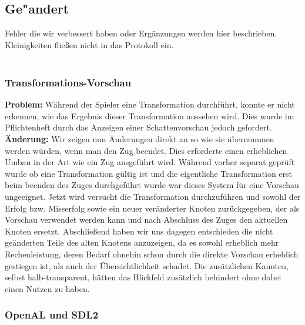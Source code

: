 %



\subsection{Ge{"a}ndert}
\label{Abschnitt:Aenderungen:Protokoll:Behobene_Probleme}

Fehler die wir verbessert haben oder Ergänzungen werden hier beschrieben. Kleinigkeiten fließen nicht in das Protokoll ein.\\~\\



\subsubsection*{Transformations-Vorschau}

\textbf{Problem:}
Während der Spieler eine Transformation durchführt, konnte er nicht erkennen, wie das Ergebnis dieser Transformation aussehen wird.
Dies wurde im Pflichtenheft durch das Anzeigen einer Schattenvorschau jedoch gefordert.\\

\textbf{Änderung:}
Wir zeigen nun Änderungen direkt an so wie sie übernommen werden würden, wenn man den Zug beendet. Dies erforderte einen erheblichen Umbau in der Art wie ein Zug ausgeführt wird.
Während vorher separat geprüft wurde ob eine Transformation gültig ist und die eigentliche Transformation erst beim beenden des Zuges durchgeführt wurde war dieses System für eine Vorschau ungeeignet. Jetzt wird versucht die Transformation durchzuführen und sowohl der Erfolg bzw. Misserfolg sowie ein neuer veränderter Knoten zurückgegeben, der als Vorschau verwendet werden kann und nach Abschluss des Zuges den aktuellen Knoten ersetzt.
Abschließend haben wir uns dagegen entschieden die nicht geänderten Teile des alten Knotens anzuzeigen, da es sowohl erheblich mehr Rechenleistung, deren Bedarf ohnehin schon durch die direkte Vorschau erheblich gestiegen ist, als auch der Übersichtlichkeit schadet. Die zusätzlichen Kannten, selbst halb-transparent, hätten das Blickfeld zusätzlich behindert ohne dabei einen Nutzen zu haben.\\



\clearpage



\subsubsection*{OpenAL und SDL2}

